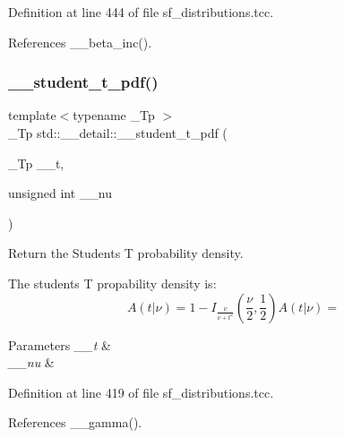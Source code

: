 Definition at line 444 of file sf\+\_\+distributions.\+tcc.



References \+\_\+\+\_\+beta\+\_\+inc().

\mbox{\label{namespacestd_1_1____detail_a866bf8f03fd2d5de5024837727beecd8}} 
\subsubsection{\texorpdfstring{\+\_\+\+\_\+student\+\_\+t\+\_\+pdf()}{\_\_student\_t\_pdf()}}
{\footnotesize\ttfamily template$<$typename \+\_\+\+Tp $>$ \\
\+\_\+\+Tp std\+::\+\_\+\+\_\+detail\+::\+\_\+\+\_\+student\+\_\+t\+\_\+pdf (\begin{DoxyParamCaption}\item[{\+\_\+\+Tp}]{\+\_\+\+\_\+t,  }\item[{unsigned int}]{\+\_\+\+\_\+nu }\end{DoxyParamCaption})}



Return the Students T probability density. 

The students T propability density is\+: \[ A(t|\nu) = 1 - I_{\frac{\nu}{\nu + t^2}}(\frac{\nu}{2}, \frac{1}{2}) A(t|\nu) = \]


\begin{DoxyParams}{Parameters}
{\em \+\_\+\+\_\+t} & \\
\hline
{\em \+\_\+\+\_\+nu} & \\
\hline
\end{DoxyParams}


Definition at line 419 of file sf\+\_\+distributions.\+tcc.



References \+\_\+\+\_\+gamma().

\mbox{\label{namespacestd_1_1____detail_aa430c479c2f41513393d7cb946d260c3}} 

